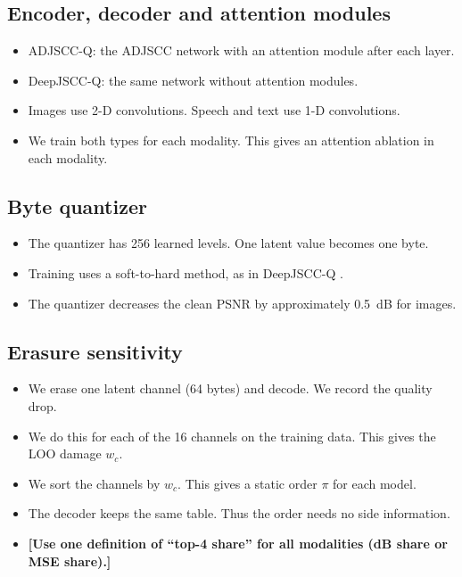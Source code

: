 \documentclass[journal]{IEEEtran}
\providecommand{\TBD}[1]{\textbf{\color{red}[#1]}}
\begin{document}
\subsection{Encoder, decoder and attention modules}
\begin{itemize}
\item ADJSCC-Q: the ADJSCC network \cite{xu2022adjscc} with an attention module after each layer.
\item DeepJSCC-Q: the same network without attention modules.
\item Images use 2-D convolutions. Speech and text use 1-D convolutions.
\item We train both types for each modality. This gives an attention ablation in each modality.
\end{itemize}

\subsection{Byte quantizer}
\begin{itemize}
\item The quantizer has 256 learned levels. One latent value becomes one byte.
\item Training uses a soft-to-hard method, as in DeepJSCC-Q \cite{tung2022deepjsccq}.
\item The quantizer decreases the clean PSNR by approximately 0.5~dB for images.
\end{itemize}

\subsection{Erasure sensitivity}
\begin{itemize}
\item We erase one latent channel (64 bytes) and decode. We record the quality drop.
\item We do this for each of the 16 channels on the training data. This gives the LOO damage $w_c$.
\item We sort the channels by $w_c$. This gives a static order $\pi$ for each model.
\item The decoder keeps the same table. Thus the order needs no side information.
\item \TBD{Use one definition of ``top-4 share'' for all modalities (dB share or MSE share).}
\end{itemize}
\end{document}
